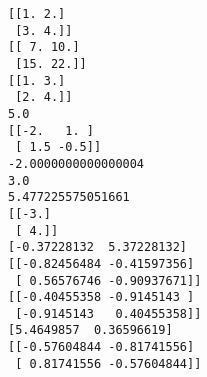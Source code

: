 \documentclass[11pt]{article}
\begin{document}
    \begin{Verbatim}[commandchars=\\\{\}]
[[1. 2.]
 [3. 4.]]
[[ 7. 10.]
 [15. 22.]]
[[1. 3.]
 [2. 4.]]
5.0
[[-2.   1. ]
 [ 1.5 -0.5]]
-2.0000000000000004
3.0
5.477225575051661
[[-3.]
 [ 4.]]
[-0.37228132  5.37228132]
[[-0.82456484 -0.41597356]
 [ 0.56576746 -0.90937671]]
[[-0.40455358 -0.9145143 ]
 [-0.9145143   0.40455358]]
[5.4649857  0.36596619]
[[-0.57604844 -0.81741556]
 [ 0.81741556 -0.57604844]]

    \end{Verbatim}


    
    
    
    
\end{document}
